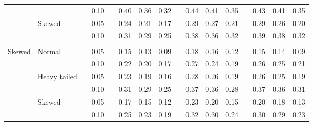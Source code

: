 \documentclass{article} %
\begin{document}
\begin{table}[ht]
\begin{scriptsize}
\begin{center}
\begin{tabular}{ll p{.1cm} c p{.1cm} rrr p{.1cm} rrr p{.1cm} rrr}
             &              && 0.10 &&   0.40 & 0.36 & 0.32 && 0.44 & 0.41 & 0.35 &&  0.43 & 0.41 & 0.35 \\
             & Skewed       && 0.05 &&   0.24 & 0.21 & 0.17 && 0.29 & 0.27 & 0.21 &&  0.29 & 0.26 & 0.20 \\
             &              && 0.10 &&   0.31 & 0.29 & 0.25 && 0.38 & 0.36 & 0.32 &&  0.39 & 0.38 & 0.32 \\
             &&&&&&&&&&&&&&&\\
Skewed       & Normal       && 0.05 &&   0.15 & 0.13 & 0.09 && 0.18 & 0.16 & 0.12 &&  0.15 & 0.14 & 0.09 \\ 
             &              && 0.10 &&   0.22 & 0.20 & 0.17 && 0.27 & 0.24 & 0.19 &&  0.26 & 0.25 & 0.21 \\ 
             & Heavy tailed && 0.05 &&   0.23 & 0.19 & 0.16 && 0.28 & 0.26 & 0.19 &&  0.26 & 0.25 & 0.19 \\ 
             &              && 0.10 &&   0.31 & 0.29 & 0.25 && 0.37 & 0.36 & 0.28 &&  0.37 & 0.36 & 0.31 \\ 
             & Skewed       && 0.05 &&   0.17 & 0.15 & 0.12 && 0.23 & 0.20 & 0.15 &&  0.20 & 0.18 & 0.13 \\ 
             &              && 0.10 &&   0.25 & 0.23 & 0.19 && 0.32 & 0.30 & 0.24 &&  0.30 & 0.29 & 0.23 \\ 


\end{tabular}
\end{center}
\end{scriptsize}
\end{table}
\end{document}
